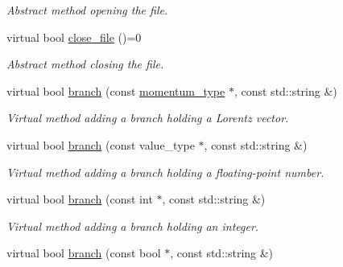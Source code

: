 \begin{DoxyCompactItemize}
\begin{DoxyCompactList}\small\item\em Abstract method opening the file. \end{DoxyCompactList}\item 
\hypertarget{a00319_a25ebf7a86cd5f93b7582aacf6932fcf2}{}virtual bool \hyperlink{a00319_a25ebf7a86cd5f93b7582aacf6932fcf2}{close\+\_\+file} ()=0\label{a00319_a25ebf7a86cd5f93b7582aacf6932fcf2}

\begin{DoxyCompactList}\small\item\em Abstract method closing the file. \end{DoxyCompactList}\item 
\hypertarget{a00319_a2a076e52335cd34901d796b50eb43e95}{}virtual bool \hyperlink{a00319_a2a076e52335cd34901d796b50eb43e95}{branch} (const \hyperlink{a00579}{momentum\+\_\+type} $\ast$, const std\+::string \&)\label{a00319_a2a076e52335cd34901d796b50eb43e95}

\begin{DoxyCompactList}\small\item\em Virtual method adding a branch holding a Lorentz vector. \end{DoxyCompactList}\item 
\hypertarget{a00319_a84acdedce7e9f533520359eea3c5e8ba}{}virtual bool \hyperlink{a00319_a84acdedce7e9f533520359eea3c5e8ba}{branch} (const value\+\_\+type $\ast$, const std\+::string \&)\label{a00319_a84acdedce7e9f533520359eea3c5e8ba}

\begin{DoxyCompactList}\small\item\em Virtual method adding a branch holding a floating-\/point number. \end{DoxyCompactList}\item 
\hypertarget{a00319_ab4d33b8a2d429fa44a9f75c8b202c889}{}virtual bool \hyperlink{a00319_ab4d33b8a2d429fa44a9f75c8b202c889}{branch} (const int $\ast$, const std\+::string \&)\label{a00319_ab4d33b8a2d429fa44a9f75c8b202c889}

\begin{DoxyCompactList}\small\item\em Virtual method adding a branch holding an integer. \end{DoxyCompactList}\item 
\hypertarget{a00319_af1c0d6fc5a8027f99756653914d116c6}{}virtual bool \hyperlink{a00319_af1c0d6fc5a8027f99756653914d116c6}{branch} (const bool $\ast$, const std\+::string \&)\label{a00319_af1c0d6fc5a8027f99756653914d116c6}


\end{DoxyCompactItemize}

